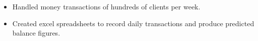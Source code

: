 \documentclass{resume}
\begin{document}
\begin{minipage}[t]{0.63\linewidth}
\begin{itemize}
    \item Handled money transactions of hundreds of clients per week.
    \item Created excel spreadsheets to record daily transactions and produce predicted balance figures.
\end{itemize}


\end{minipage}
\end{document}
